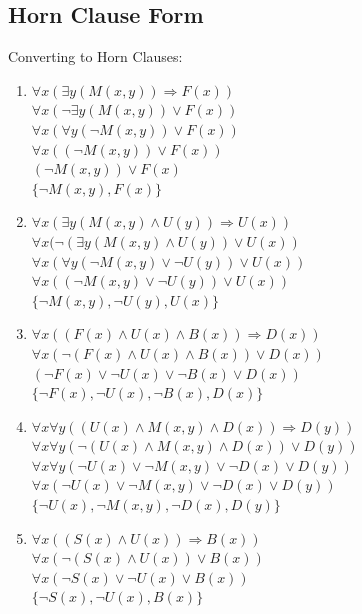 \documentclass[12pt]{article}
\newcommand{\impl}{\mathbin{\Rightarrow}}
\begin{document}
\subsection*{Horn Clause Form}
Converting to Horn Clauses:
\begin{enumerate}
\setlength{\itemsep}{-0.5ex}
\item
$\forall x (\exists y (M(x, y)) \impl F(x))$ \\
$\forall x (\neg \exists y (M(x, y)) \lor F(x))$ \\
$\forall x (\forall y (\neg M(x, y)) \lor F(x))$ \\
$\forall x ((\neg M(x, y)) \lor F(x))$ \\
$(\neg M(x, y)) \lor F(x)$ \\
$\{\neg M(x, y), F(x)\}$ \\
\item
$\forall x (\exists y (M(x, y) \land U(y)) \impl U(x))$ \\
$\forall x (\neg (\exists y (M(x, y) \land U(y)) \lor U(x))$ \\
$\forall x (\forall y (\neg M(x, y) \lor \neg U(y)) \lor U(x))$ \\
$\forall x ((\neg M(x, y) \lor \neg U(y)) \lor U(x))$ \\
$\{\neg M(x, y), \neg U(y), U(x)\}$ \\
\item
$\forall x ((F(x) \land U(x) \land B(x)) \impl D(x))$ \\
$\forall x (\neg (F(x) \land U(x) \land B(x)) \lor D(x))$ \\
$(\neg F(x) \lor \neg U(x) \lor \neg B(x) \lor D(x))$ \\
$\{\neg F(x), \neg U(x), \neg B(x), D(x)\}$ \\
\item
$\forall x \forall y ((U(x) \land M(x, y) \land D(x)) \impl D(y))$ \\
$\forall x \forall y (\neg (U(x) \land M(x, y) \land D(x)) \lor D(y))$ \\
$\forall x \forall y (\neg U(x) \lor \neg M(x, y) \lor \neg D(x) \lor D(y))$ \\
$\forall x (\neg U (x) \lor \neg M(x, y) \lor \neg D(x) \lor D(y))$ \\
$\{\neg U(x), \neg M(x, y), \neg D(x), D(y)\}$ \\
\item
$\forall x ((S(x) \land U(x)) \impl B(x))$ \\
$\forall x (\neg (S(x) \land U(x)) \lor B(x))$ \\
$\forall x (\neg S(x) \lor \neg U(x) \lor B(x))$ \\
$\{\neg S(x), \neg U(x), B(x)\}$ \\
\end{enumerate}
\end{document}
